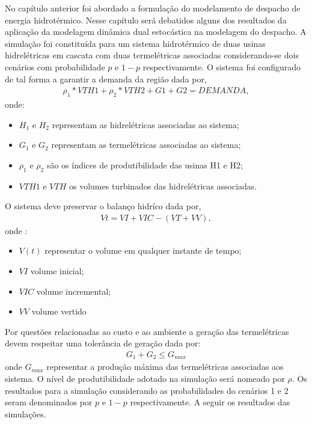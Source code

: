 \graphicspath{ {/home/jefferson/Modelagem/} }
No cap\'itulo anterior foi abordado a formula\c c\~ao do modelamento de despacho de energia hidrot\'ermico. Nesse
cap\'itulo ser\'a debatidos alguns dos resultados da aplica\c c\~ao da modelagem din\^amica dual estoc\'astica na
modelagem do despacho.
A simula\c c\~ao  foi constitu\'ida para um sistema hidrot\'ermico de duas usinas hidrel\'etricas em cascata
com duas termel\'etricas associadas considerando-se dois cen\'arios com probabilidade $p$ e $1-p$ respectivamente.
O sistema foi configurado de tal forma a garantir a demanda da regi\~ao dada por,
\begin{align*}
  \displaystyle{\rho}_1*VTH1 + {\rho}_2*VTH2 + G1 + G2 = DEMANDA,
\end{align*}
onde:
\begin{itemize}
	\item $H_1$ e $H_2$ representam as hidrel\'etricas associadas ao sistema;
	\item $G_1$ e $G_2$ representam as termel\'etricas associadas ao sistema;
	\item $\rho_1$ e $\rho_2$ s\~ao os \'indices de produtibilidade das usinas H1 e H2;
	\item $VTH1$ e $VTH$  os volumes turbinados das hidrel\'etricas associadas.
\end{itemize}
O sistema deve preservar o balan\c co hidr\'ico dada por,
\begin{align*}
  \displaystyle Vt = VI + VIC - \left( VT + VV \right), 
\end{align*}
onde : 
\begin{itemize}
	\item $V(t)$ representar o volume em qualquer instante de tempo;
	\item $VI$  volume inicial;
	\item $VIC$ volume incremental;
	\item $VV$ volume vertido
\end{itemize}
Por quest\~oes relacionadas ao custo e ao ambiente a gera\c c\~ao das termel\'etricas devem respeitar uma toler\^ancia de
gera\c c\~ao dada por:
\begin{align*}
	G_1 + G_2 \leq G_{max}
\end{align*}
onde $G_{max}$ representar a produ\c c\~ao m\'axima das termel\'etricas associadas aos sistema. O n\'ivel de
produtibilidade adotado na simula\c c\~ao ser\'a nomeado por $\rho$. 
Os resultados para a
simula\c c\~ao considerando as probabilidades do cen\'arios 1 e 2 seram denominados  por $p$ e $ 1 -
p$ respectivamente. A seguir os resultados das simula\c c\~oes.
